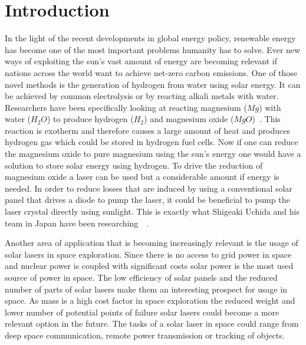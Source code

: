 \documentclass[a4paper,10pt]{article}
\begin{document}


    \tableofcontents

    \newpage

    \listoffigures

    \newpage

    \listoftables

    \newpage

    \section{Introduction}

    In the light of the recent developments in global energy policy,
    renewable energy has become one of the most important
    problems humanity has to solve.
    Ever new ways of exploiting the sun's vast amount of energy are
    becoming relevant if nations across the world want to achieve
    net-zero carbon emissions.
    One of those novel methods is the generation of hydrogen from
    water using solar energy.
    It can be achieved by common electrolysis or by reacting alkali
    metals with water.
    Researchers have been specifically looking at reacting magnesium
    ($Mg$) with water ($H_2O$) to produce hydrogen ($H_2$) and magnesium oxide
    ($MgO$)~\cite{solar_lasers_paper}.
    This reaction is exotherm and therefore causes a large amount of heat
    and produces hydrogen gas which could be stored in hydrogen fuel cells.
    Now if one can reduce the magnesium oxide to pure magnesium using
    the sun's energy one would have a solution to store solar energy
    using hydrogen.
    To drive the reduction of magnesium oxide a laser can be used but
    a considerable amount if energy is needed.
    In order to reduce losses that are induced by using a conventional
    solar panel that drives a diode to pump the laser, it could be
    beneficial to pump the laser crystal directly using sunlight.
    This is exactly what Shigeaki Uchida and his team in Japan have
    been researching~\cite{solar_lasers_wiki}~\cite{solar_lasers_magnesium}.
    
    Another area of application that is becoming increasingly relevant is
    the usage of solar lasers in space exploration.
    Since there is no access to grid power in space and nuclear power
    is coupled with significant costs solar power is the most used
    source of power in space.
    The low efficiency of solar panels and the reduced number of parts
    of solar lasers make them an interesting prospect for usage in
    space.
    As mass is a high cost factor in space exploration the reduced weight
    and lower number of potential points of failure solar lasers could
    become a more relevant option in the future.
    The tasks of a solar laser in space could range from deep space
    communication, remote power transmission or tracking of objects.
\end{document}
